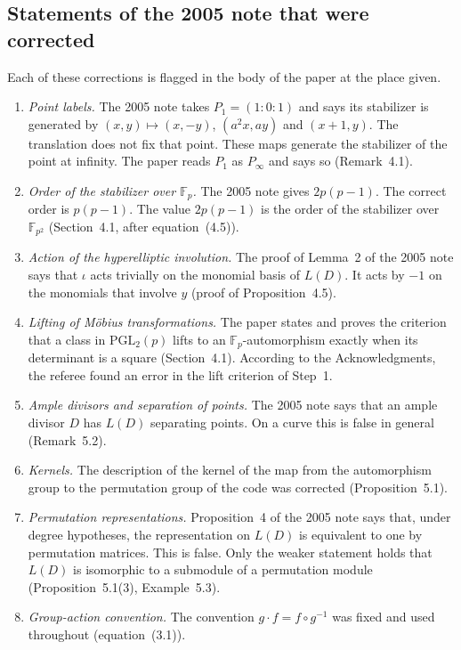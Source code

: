 \documentclass[12pt,letterpaper]{article}
\newcommand{\F}{\mathbb{F}}
\begin{document}
\subsection{Statements of the 2005 note that were corrected}\label{sec:errors}
Each of these corrections is flagged in the body of the paper at the place given.
\begin{enumerate}
\item \emph{Point labels.} The 2005 note takes $P_1=(1:0:1)$ and says its
stabilizer is generated by $(x,y)\mapsto(x,-y)$, $(a^2x,ay)$ and $(x+1,y)$. The
translation does not fix that point. These maps generate the stabilizer of the
point at infinity. The paper reads $P_1$ as $P_\infty$ and says so (Remark~4.1).
\item \emph{Order of the stabilizer over $\F_p$.} The 2005 note gives $2p(p-1)$.
The correct order is $p(p-1)$. The value $2p(p-1)$ is the order of the stabilizer
over $\F_{p^2}$ (Section~4.1, after equation~(4.5)).
\item \emph{Action of the hyperelliptic involution.} The proof of Lemma~2 of the
2005 note says that $\iota$ acts trivially on the monomial basis of $L(D)$. It
acts by $-1$ on the monomials that involve $y$ (proof of Proposition~4.5).
\item \emph{Lifting of M\"obius transformations.} The paper states and proves the
criterion that a class in $\mathrm{PGL}_2(p)$ lifts to an $\F_p$-automorphism
exactly when its determinant is a square (Section~4.1). According to the
Acknowledgments, the referee found an error in the lift criterion of Step~1.
\item \emph{Ample divisors and separation of points.} The 2005 note says that an
ample divisor $D$ has $L(D)$ separating points. On a curve this is false in
general (Remark~5.2).
\item \emph{Kernels.} The description of the kernel of the map from the
automorphism group to the permutation group of the code was corrected
(Proposition~5.1).
\item \emph{Permutation representations.} Proposition~4 of the 2005 note says
that, under degree hypotheses, the representation on $L(D)$ is equivalent to one
by permutation matrices. This is false. Only the weaker statement holds that
$L(D)$ is isomorphic to a submodule of a permutation module
(Proposition~5.1(3), Example~5.3).
\item \emph{Group-action convention.} The convention $g\cdot f=f\circ g^{-1}$ was
fixed and used throughout (equation~(3.1)).
\end{enumerate}
\end{document}
